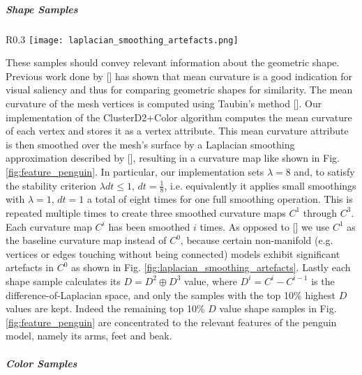 \subparagraph{Shape Samples}

\begin{wrapfigure}{R}{0.3\textwidth}
\texttt{[image: laplacian\_smoothing\_artefacts.png]}
\caption{$C^0$ (left) exhibits significant artefacts on a non-manifold mesh. $C^1$ (right) is a more sensible curvature map as baseline for the shown model.}
\label{fig:laplacian_smoothing_artefacts}
\end{wrapfigure}

These samples should convey relevant information about the geometric shape. Previous work done by [] has
shown that mean curvature is a good indication for visual saliency and thus for comparing geometric shapes for similarity. The mean curvature of the mesh vertices is computed using Taubin's method [].
Our implementation of the ClusterD2+Color algorithm computes the mean curvature of each vertex and stores it as a vertex attribute. This mean curvature attribute is then smoothed over the mesh's surface
by a Laplacian smoothing approximation described by [], resulting in a curvature map like shown in Fig. \ref{fig:feature_penguin}.
In particular, our implementation sets $\lambda = 8$ and, to satisfy the stability criterion $\lambda dt \leq 1$, $dt = \frac{1}{8}$, i.e. equivalently it applies small smoothings with $\lambda = 1$, $dt = 1$ a total of eight times for one
full smoothing operation. This is repeated multiple times to create three smoothed curvature maps $C^1$ through $C^3$. Each curvature map $C^i$ has been smoothed $i$ times. As opposed to [] we use
$C^1$ as the baseline curvature map instead of $C^0$, because certain non-manifold (e.g. vertices or edges touching without being connected) models exhibit significant artefacts in $C^0$ as shown in Fig. \ref{fig:laplacian_smoothing_artefacts}. Lastly each shape sample calculates its $D = D^2 \oplus D^3$ value, where $D^i = C^i - C^{i-1}$ is the difference-of-Laplacian space, and only the samples with the top 10\% highest $D$ values are kept. Indeed the remaining top
10\% $D$ value shape samples in Fig. \ref{fig:feature_penguin} are concentrated to the relevant features of the penguin model, namely its arms, feet and beak.

\subparagraph{Color Samples}

